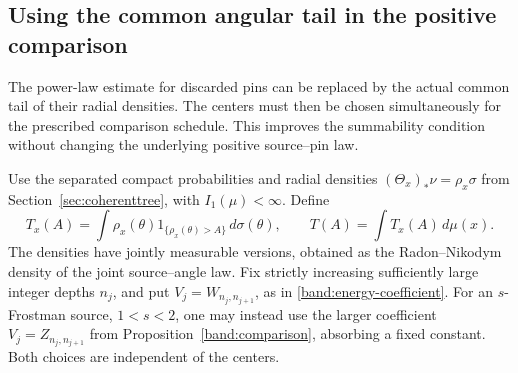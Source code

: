 \subsection{Using the common angular tail in the positive comparison}
\label{tails:section}

The power-law estimate for discarded pins can be replaced by the
actual common tail of their radial densities. The centers must then be
chosen simultaneously for the prescribed comparison schedule. This
improves the summability condition without changing the underlying
positive source--pin law.

Use the separated compact probabilities and radial densities
\((\Theta_x)_*\nu=\rho_x\sigma\) from
Section~\ref{sec:coherenttree}, with \(I_1(\mu)<\infty\). Define
$$
T_x(A)=\int\rho_x(\theta)1_{\{\rho_x(\theta)>A\}}\,d\sigma(\theta),
\qquad T(A)=\int T_x(A)\,d\mu(x).
$$
The densities have jointly measurable versions, obtained as the
Radon--Nikodym density of the joint source--angle law. Fix strictly
increasing sufficiently large integer depths \(n_j\), and put
\(V_j=W_{n_j,n_{j+1}}\), as in
\eqref{band:energy-coefficient}. For an \(s\)-Frostman source,
\(1<s<2\), one may instead use the larger coefficient
\(V_j=Z_{n_j,n_{j+1}}\) from Proposition~\ref{band:comparison},
absorbing a fixed constant. Both choices are independent of the centers.

